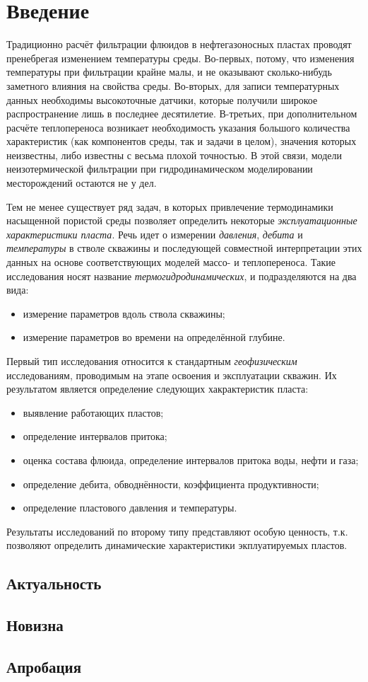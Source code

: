 \section*{Введение}
\setcounter{subsection}{0}
	
	Традиционно расчёт фильтрации флюидов в нефтегазоносных пластах проводят пренебрегая изменением температуры среды. Во-первых, потому, что изменения температуры при фильтрации крайне малы, и не оказывают сколько-нибудь заметного влияния на свойства среды. Во-вторых, для записи температурных данных необходимы высокоточные датчики, которые получили широкое распространение лишь в последнее десятилетие. В-третьих, при дополнительном расчёте теплопереноса возникает необходимость указания большого количества характеристик (как компонентов среды, так и задачи в целом), значения которых неизвестны, либо известны с весьма плохой точностью. В этой связи, модели неизотермической фильтрации при гидродинамическом моделировании месторождений остаются не у дел.

	Тем не менее существует ряд задач, в которых привлечение термодинамики насыщенной пористой среды позволяет определить некоторые \textit{эксплуатационные характеристики пласта}. Речь идет о измерении \textit{давления}, \textit{дебита} и \textit{температуры} в стволе скважины и последующей совместной интерпретации этих данных на основе соответствующих моделей массо- и теплопереноса.
Такие исследования носят название \textit{термогидродинамических}, и подразделяются на два вида:
\begin{itemize}
	\item измерение параметров вдоль ствола скважины;
	\item измерение параметров во времени на определённой глубине.
\end{itemize}
	
	Первый тип исследования относится к стандартным \textit{геофизическим} исследованиям, проводимым на этапе освоения и эксплуатации скважин. Их результатом является определение следующих хакрактеристик пласта:
\begin{itemize}
	\item выявление работающих пластов;
	\item определение интервалов притока;
	\item оценка состава флюида, определение интервалов притока воды, нефти и газа;
	\item определение дебита, обводнённости, коэффициента продуктивности;
	\item определение пластового давления и температуры.
\end{itemize}
	
	Результаты исследований по второму типу представляют особую ценность, т.к. позволяют определить динамические характеристики экплуатируемых пластов. 
	
\subsection*{Актуальность}

\subsection*{Новизна}

\subsection*{Апробация}